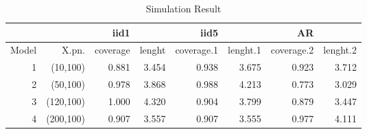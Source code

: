 \documentclass[11pt,oneside, a4paper]{amsart}\usepackage[]{graphicx}\usepackage[]{color}
\begin{document}
\begin{table}[ht]
\centering
\caption{Simulation Result} 
\label{Test_table}
{\footnotesize
\begin{tabular}{|r|r|rr|rr|rr|}
  \toprule 
    &  & iid1 &  & iid5 & & AR & \\
 \midrule 
Model & X.pn. & coverage & lenght & coverage.1 & lenght.1 & coverage.2 & lenght.2 \\ 
    1 & (10,100) & 0.881 & 3.454 & 0.938 & 3.675 & 0.923 & 3.712 \\ 
     2 & (50,100) & 0.978 & 3.868 & 0.988 & 4.213 & 0.773 & 3.029 \\ 
     3 & (120,100) & 1.000 & 4.320 & 0.904 & 3.799 & 0.879 & 3.447 \\ 
     4 & (200,100) & 0.907 & 3.557 & 0.907 & 3.555 & 0.977 & 4.111 \\ 
   \bottomrule 
\end{tabular}
}
\end{table}
\end{document}
